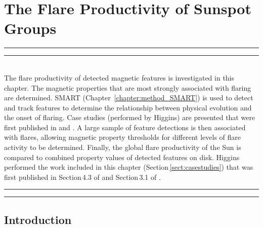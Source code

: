 
\chapter{The Flare Productivity of Sunspot Groups} %
\label{chapter:results_activity}


\graphicspath{{X/figures/EPS/}{5/figures/}}

\glsresetall

\hrule height 1mm
\vspace{0.5mm}
\hrule height 0.4mm 
\noindent 
\\
The flare productivity of detected magnetic features is investigated in this chapter. The magnetic properties that are most strongly associated with flaring are determined. SMART (Chapter~\ref{chapter:method_SMART}) is used to detect and track features to determine the relationship between physical evolution and the onset of flaring. Case studies (performed by Higgins) are presented that were first published in  and . A large sample of feature detections is then associated with flares, allowing magnetic property thresholds for different levels of flare activity to be determined. Finally, the global flare productivity of the Sun is compared to combined property values of detected features on disk. Higgins performed the work included in this chapter (Section\,\ref{sect:casestudies}) that was first published in  Section\,4.3 of  and Section\,3.1 of . 
\\ 
\hrule height 0.4mm
\vspace{0.5mm}
\hrule height 1mm 
\vspace{1.5cm}


\section{Introduction}

